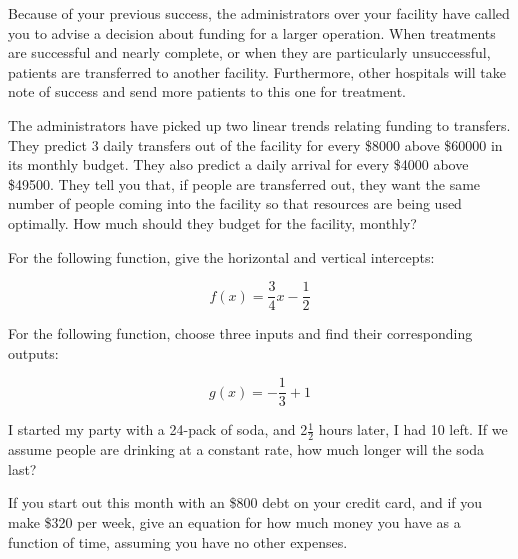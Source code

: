 \begin{exercise}
Because of your previous success, the administrators over your facility have called you to advise a decision about funding for a larger operation.  When treatments are successful and nearly complete, or when they are particularly unsuccessful, patients are transferred to another facility.  Furthermore, other hospitals will take note of success and send more patients to this one for treatment.

The administrators have picked up two linear trends relating funding to transfers.  They predict 3 daily transfers out of the facility for every \$8000 above \$60000 in its monthly budget.  They also predict a daily arrival for every \$4000 above \$49500.  They tell you that, if people are transferred out, they want the same number of people coming into the facility so that resources are being used optimally.  How much should they budget for the facility, monthly?

\end{exercise}
\bigskip

\begin{exercise}

\end{exercise}
\bigskip

\begin{exercise}
For the following function, give the horizontal and vertical intercepts:

$$f(x) = \frac{3}{4}x - \frac{1}{2}$$

For the following function, choose three inputs and find their corresponding outputs:

$$g(x) = -\frac{1}{3} + 1$$


\end{exercise}
\bigskip

\begin{exercise}
\end{exercise}
\bigskip

\begin{exercise}
I started my party with a 24-pack of soda, and 2$\frac{1}{2}$ hours later, I had 10 left.  If we assume people are drinking at a constant rate, how much longer will the soda last?
\end{exercise}
\bigskip

\begin{exercise}
If you start out this month with an \$800 debt on your credit card, and if you make \$320 per week, give an equation for how much money you have as a function of time, assuming you have no other expenses.
\end{exercise}
\bigskip

